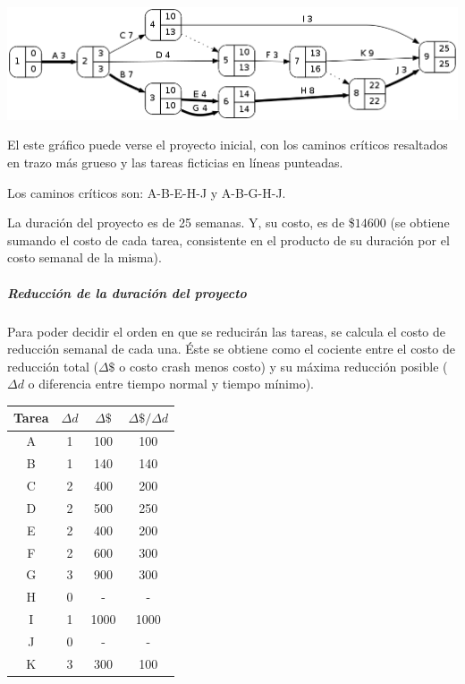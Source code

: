 \documentclass[a4paper,10pt]{article}
\begin{document}
  \begin{center}
    \includegraphics[scale=0.4,keepaspectratio=true]{img/ej3-0.png} 
  \end{center}

  El este gráfico puede verse el proyecto inicial, con los caminos críticos resaltados en trazo más grueso y las tareas ficticias en líneas punteadas.

  Los caminos críticos son: A-B-E-H-J y A-B-G-H-J.

  La duración del proyecto es de 25 semanas. Y, su costo, es de \$$14600$ (se obtiene sumando el costo de cada tarea, consistente en el producto de su duración por el costo semanal de la misma).

  \subparagraph{Reducción de la duración del proyecto}

  Para poder decidir el orden en que se reducirán las tareas, se calcula el costo de reducción semanal de cada una. Éste se obtiene como el cociente entre el costo de reducción total ($\Delta \$$ o costo crash menos costo) y su máxima reducción posible ($\Delta d$ o diferencia entre tiempo normal y tiempo mínimo).

   \begin{center}
   \begin{tabular}{|| c | c | c | c ||}
   \hline 
      Tarea & $\Delta d$ & $\Delta \$$ & $\Delta \$ / \Delta d$ \\ \hline \hline
      A & 1 & 100 & 100 \\ \hline
      B & 1 & 140 & 140 \\ \hline 
      C & 2 & 400 & 200 \\ \hline
      D & 2 & 500 & 250 \\ \hline
      E & 2 & 400 & 200 \\ \hline
      F & 2 & 600 & 300 \\ \hline
      G & 3 & 900 & 300 \\ \hline
      H & 0 &  -  & -   \\ \hline
      I & 1 &1000 & 1000\\ \hline
      J & 0 &  -  & -   \\ \hline
      K & 3 & 300 & 100 \\ \hline
   \end{tabular}
   \end{center}
\end{document}

